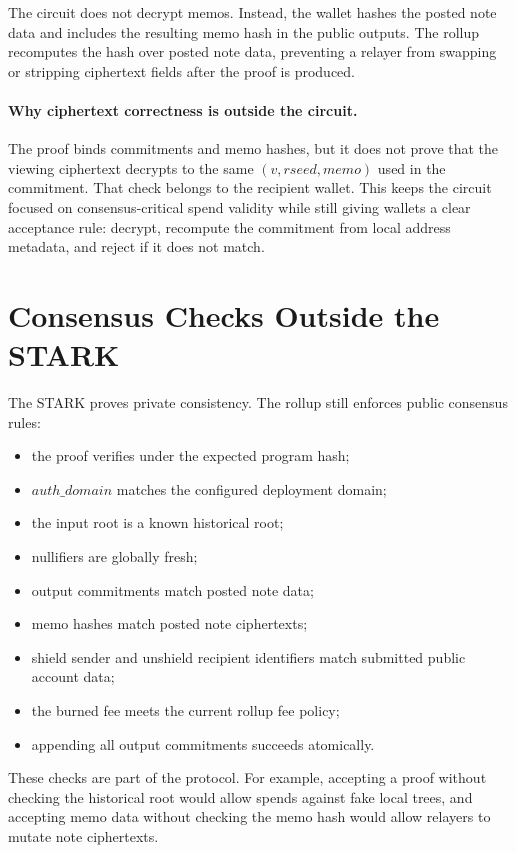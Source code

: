 \documentclass[11pt]{article}
\begin{document}
The circuit does not decrypt memos. Instead, the wallet hashes the posted note
data and includes the resulting memo hash in the public outputs. The rollup
recomputes the hash over posted note data, preventing a relayer from swapping or
stripping ciphertext fields after the proof is produced.

\paragraph{Why ciphertext correctness is outside the circuit.}
The proof binds commitments and memo hashes, but it does not prove that the
viewing ciphertext decrypts to the same \((v, rseed, memo)\) used in the
commitment. That check belongs to the recipient wallet. This keeps the circuit
focused on consensus-critical spend validity while still giving wallets a clear
acceptance rule: decrypt, recompute the commitment from local address metadata,
and reject if it does not match.

\section{Consensus Checks Outside the STARK}

The STARK proves private consistency. The rollup still enforces public
consensus rules:

\begin{itemize}
  \item the proof verifies under the expected program hash;
  \item \(auth\_domain\) matches the configured deployment domain;
  \item the input root is a known historical root;
  \item nullifiers are globally fresh;
  \item output commitments match posted note data;
  \item memo hashes match posted note ciphertexts;
  \item shield sender and unshield recipient identifiers match submitted
        public account data;
  \item the burned fee meets the current rollup fee policy;
  \item appending all output commitments succeeds atomically.
\end{itemize}

These checks are part of the protocol. For example, accepting a proof without
checking the historical root would allow spends against fake local trees, and
accepting memo data without checking the memo hash would allow relayers to
mutate note ciphertexts.
\end{document}
